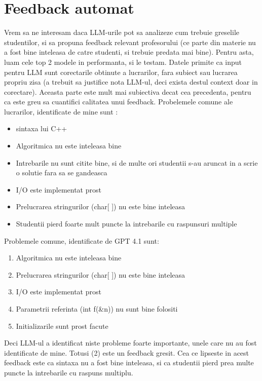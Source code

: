\documentclass[12pt, a4paper]{report}
\begin{document}
\section{Feedback automat}
Vrem sa ne interesam daca LLM-urile pot sa analizeze cum trebuie greselile studentilor,
si sa propuna feedback relevant profesorului (ce parte din materie nu a fost bine inteleasa de catre studenti, si trebuie predata mai bine).
Pentru asta, luam cele top 2 modele in performanta, si le testam. Datele primite ca input pentru LLM sunt corectarile obtinute a lucrarilor, fara subiect sau lucrarea propriu zisa (a trebuit sa justifice nota LLM-ul, deci exista destul context doar in corectare).
Aceasta parte este mult mai subiectiva decat cea precedenta, pentru ca este greu sa cuantifici calitatea unui feedback.
Probelemele comune ale lucrarilor, identificate de mine sunt :
\begin{itemize}
  \item sintaxa lui C++
  \item Algoritmica nu este inteleasa bine
  \item Intrebarile nu sunt citite bine, si de multe ori studentii s-au aruncat in a scrie o solutie fara sa se gandeasca
  \item I/O este implementat prost 
  \item Prelucrarea stringurilor (char[ ]) nu este bine inteleasa
  \item Studentii pierd foarte mult puncte la intrebarile cu raspunsuri multiple


\end{itemize}

Problemele comune, identificate de GPT 4.1 sunt:
\begin{enumerate}
  \item Algoritmica nu este inteleasa bine
  \item Prelucrarea stringurilor (char[ ]) nu este bine inteleasa
  \item I/O este implementat prost
  \item Parametrii referinta (int f(\&n)) nu sunt bine folositi
  \item Initializarile sunt prost facute
\end{enumerate}

Deci LLM-ul a identificat niste probleme foarte importante, unele care nu au fost identificate de mine. Totusi (2) este un feedback gresit.
Cea ce lipseste in acest feedback este ca sintaxa nu a fost bine inteleasa, si ca studentii pierd prea multe puncte la intrebarile cu raspuns multiplu.
\end{document}
